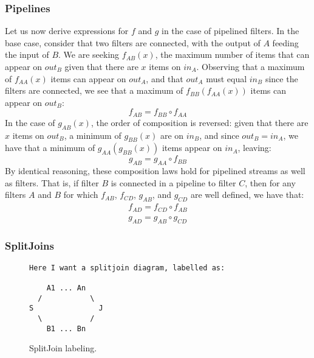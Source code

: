 \subsubsection{Pipelines}

Let us now derive expressions for $f$ and $g$ in the case of pipelined
filters.  In the base case, consider that two filters are connected,
with the output of $A$ feeding the input of $B$.  We are seeking
$f_{AB}(x)$, the maximum number of items that can appear on $out_B$
given that there are $x$ items on $in_A$.  Observing that a maximum of
$f_{AA}(x)$ items can appear on $out_A$, and that $out_A$ must equal
$in_B$ since the filters are connected, we see that a maximum of
$f_{BB}(f_{AA}(x))$ items can appear on $out_B$:
\begin{equation*}
f_{AB} = f_{BB} \circ f_{AA}
\end{equation*}
In the case of $g_{AB}(x)$, the order of composition is reversed:
given that there are $x$ items on $out_B$, a minimum of $g_{BB}(x)$
are on $in_B$, and since $out_B = in_A$, we have that a minimum of
$g_{AA}(g_{BB}(x))$ items appear on $in_A$, leaving:
\begin{equation*}
g_{AB} = g_{AA} \circ f_{BB}
\end{equation*}
By identical reasoning, these composition laws hold for pipelined
streams as well as filters.  That is, if filter $B$ is connected in a
pipeline to filter $C$, then for any filters $A$ and $B$ for which
$f_{AB}$, $f_{CD}$, $g_{AB}$, and $g_{CD}$ are well defined, we have that:
\begin{eqnarray*}
f_{AD} = f_{CD} \circ f_{AB} \\
g_{AD} = g_{AB} \circ g_{CD}
\end{eqnarray*}

\subsubsection{SplitJoins}

\begin{figure}[t]
\scriptsize
\begin{verbatim}
Here I want a splitjoin diagram, labelled as:

    A1 ... An 
  /           \
S               J
  \           /
    B1 ... Bn

\end{verbatim}
\vspace{-12pt}
\caption{\protect\small SplitJoin labeling.
\protect\label{splitjoin}}
\vspace{-12pt}
\end{figure}

